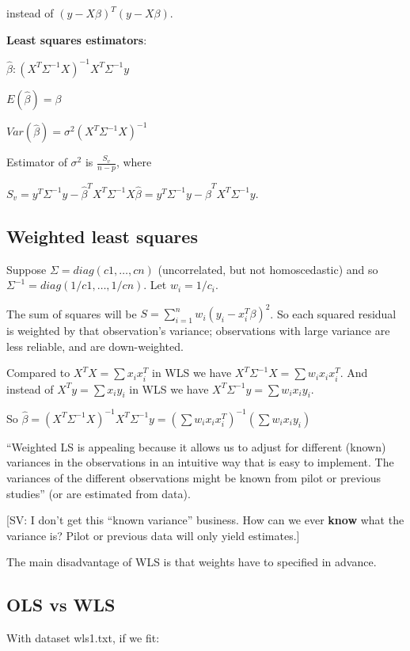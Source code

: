 instead of $(y-X\beta)^T (y-X\beta)$.

\textbf{Least squares estimators}:

$\hat{\beta}: (X^T \Sigma^{-1} X)^{-1}X^T \Sigma^{-1} y$

$E(\hat{\beta})=\beta$

$Var(\hat{\beta})=\sigma^2 (X^T \Sigma^{-1}X)^{-1}$


Estimator of $\sigma^2$ is $\frac{S_v}{n-p}$, where

$S_v=y^T \Sigma^{-1} y - \hat{\beta}^T X^T \Sigma^{-1} X\hat{\beta} = y^T \Sigma^{-1} y - \hat{\beta}^T X^T \Sigma^{-1} y$.

\subsection{Weighted least squares}

Suppose $\Sigma=diag(c1,\dots,cn)$ (uncorrelated, but not homoscedastic) and so $\Sigma^{-1}=diag(1/
c1,\dots,1/cn)$. Let $w_i = 1/c_i$. 

The sum of squares will be 
$S=\sum_{i=1}^n w_i (y_i - x_i^T \beta)^2$. So each squared residual is weighted by that observation's variance; observations with large variance are less reliable, and are down-weighted.

Compared to $X^T X = \sum x_i x_i^T$ in WLS we have  $X^T \Sigma^{-1} X = \sum w_i x_i x_i^T$. 
And instead of $X^T y = \sum x_i y_i$ in WLS we have $X^T \Sigma^{-1}y = \sum w_i x_i y_i$.

So $\hat{\beta}=(X^T \Sigma^{-1}  X)^{-1}X^T \Sigma^{-1}y= ( \sum w_i x_i x_i^T)^{-1} (\sum w_i x_i y_i)$

``Weighted LS is appealing because it allows us to adjust for different (known) variances in the observations in an intuitive way that is easy to implement. The variances of the different observations might be known from pilot or previous studies'' (or are estimated from data).

[SV: I don't get this ``known variance'' business. How can we ever \textbf{know} what the variance is? Pilot or previous data will only yield estimates.]

The main disadvantage of WLS is that weights have to specified in advance.

\subsection{OLS vs WLS}

With dataset wls1.txt, if we fit:

